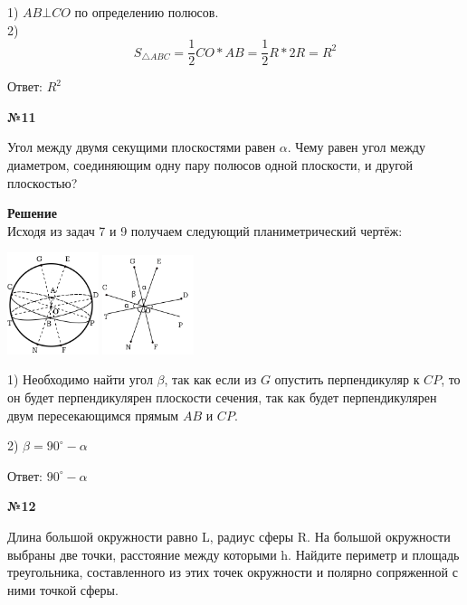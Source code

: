     1) $AB \bot CO$ по определению полюсов.\\

    2)\[
          S_{\triangle ABC} = \frac{1}{2} CO * AB = \frac{1}{2} R * 2R = R ^ 2
    \]

    Ответ: $R ^ 2$
    \begin{center}
        \textbf{№11}
    \end{center}

    Угол между двумя секущими плоскостями равен $\alpha$.
    Чему равен угол между диаметром, соединяющим одну пару полюсов одной плоскости, и другой плоскостью?

    \textbf{Решение}\\

    Исходя из задач 7 и 9 получаем следующий планиметрический чертёж:

    \begin{center}
        \includegraphics[width=0.2\textwidth]{images/img7} \quad
        \includegraphics[width=0.2\textwidth]{images/img8}\\
    \end{center}

    1) Необходимо найти угол $\beta$, так как если из $G$ опустить перпендикуляр к $CP$, то он будет перпендикулярен
    плоскости сечения, так как будет перпендикулярен двум пересекающимся прямым $AB$ и $CP$.

    2) $\beta = 90^\circ - \alpha$

    Ответ: $90^\circ - \alpha$

    \begin{center}
        \textbf{№12}
    \end{center}

    Длина большой окружности равно L, радиус сферы R.
    На большой окружности выбраны две точки, расстояние между которыми h.
    Найдите периметр и площадь треугольника,
    составленного из этих точек окружности и полярно сопряженной с ними точкой сферы.

